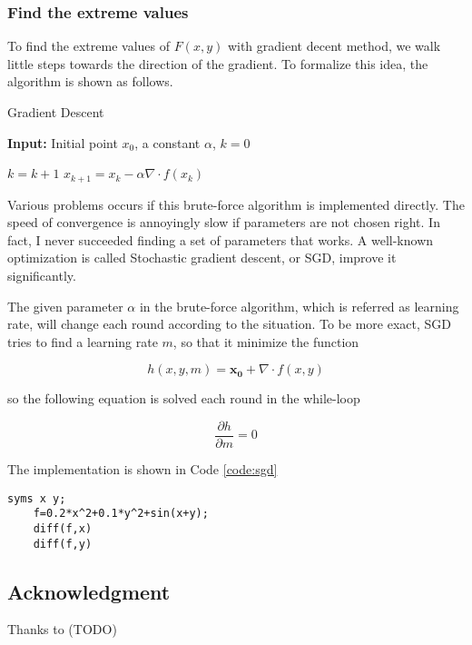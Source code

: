 \documentclass[12pt]{article}
\begin{document}
\subsubsection{Find the extreme values}
To find the extreme values of $F(x,y)$ with gradient decent method, we walk little steps towards the direction of the gradient. To formalize this idea, the algorithm is shown as follows.

\begin{algorithm}
	\caption{Gradient Descent}
	\hspace*{0.02in} {\bf Input:}
	Initial point $x_0$, a constant $\alpha$, $k=0$
	\begin{algorithmic}
	\State $k=k+1$
	\State $x_{k+1}=x_k-\alpha \nabla \cdot f(x_k)$
	
	\EndWhile
	\end{algorithmic}
\end{algorithm}

Various problems occurs if this brute-force algorithm is implemented directly. The speed of convergence is annoyingly slow if parameters are not chosen right. In fact, I never succeeded finding a set of parameters that works. A well-known optimization is called Stochastic gradient descent, or SGD, improve it significantly.

The given parameter $\alpha$ in the brute-force algorithm, which is referred as learning rate, will change each round according to the situation. To be more exact, SGD tries to find a learning rate $m$, so that it minimize the function

\begin{equation}
	h(x,y,m) = \mathbf{x_0} + \nabla \cdot f(x,y)
\end{equation}

so the following equation is solved each round in the while-loop

\begin{equation}
	\frac{\partial h}{\partial m} = 0
\end{equation}

The implementation is shown in Code \ref{code:sgd}

\begin{lstlisting}[style=MatlabStyle,caption=SGD Gradient Descent,label=code:sgd]
	syms x y;
	f=0.2*x^2+0.1*y^2+sin(x+y);
	diff(f,x)
	diff(f,y)
\end{lstlisting}


\subsection{Acknowledgment}

Thanks to (TODO)
\end{document}
